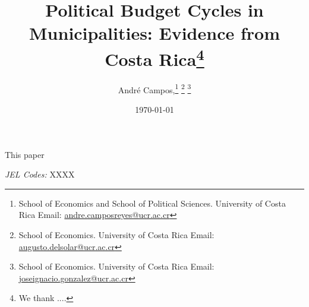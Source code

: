 \documentclass[12pt,a4paper]{article}
\title{\huge{Political Budget Cycles in Municipalities: Evidence from Costa Rica}\thanks{\footnotesize We thank ....}}
\author{\large \vspace{0.5cm} André Campos,\thanks{School of Economics and School of Political Sciences. University of Costa Rica Email: \href{mailto:andre.camposreyes@ucr.ac.cr}{andre.camposreyes@ucr.ac.cr}}
	\text{ Augusto del Solar}\thanks{School of Economics. University of Costa Rica Email: \href{mailto:augusto.delsolar@ucr.ac.cr}{augusto.delsolar@ucr.ac.cr}}
	\text{ and José I. González-Rojas, }\thanks{School of Economics. University of Costa Rica Email: \href{mailto:joseignacio.gonzalez@ucr.ac.cr}{joseignacio.gonzalez@ucr.ac.cr}}
}
\date{\today}
\begin{document}
	\onehalfspacing
	\setlength{\parindent}{1cm}
	\clearpage\maketitle
	\thispagestyle{empty}
	\setcounter{page}{0}
	\maketitle
	
	\begin{small}
		\onehalfspacing
		\vspace{0.75cm}
		This paper 
		\vspace{20pt}
		
		\textit{JEL Codes:} XXXX
	\end{small}
	
	\newpage
	\setcounter{page}{1}
	
%




	
\end{document}
